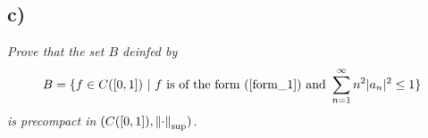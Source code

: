 \documentclass[12pt]{article}
\begin{document}
\subsection*{ c)}
\emph{Prove that the set $B$ deinfed by}
\begin{equation*}
	B = \{f \in C([0,1])\ |\ f \text{ is of the form (\ref{form_1}) and } \sum_{n=1}^\infty n^2|a_n|^2 \leq 1\}
\end{equation*}
\emph{is precompact in $(C([0,1]), \norm{\cdot}_{\text{sup}})$.}\\

\end{document}
